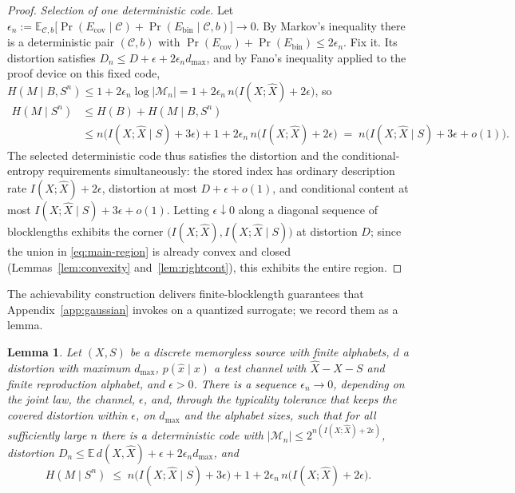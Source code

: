 \documentclass[11pt,onecolumn]{IEEEtran}
\newtheorem{lemma}[theorem]{Lemma}
\newcommand{\E}{\mathbb{E}}
\newcommand{\hX}{\widehat{X}}
\begin{document}
\begin{proof}
\emph{Selection of one deterministic code.} Let
$\epsilon_n:=\E_{\mathcal C,b}\bigl[\Pr(E_{\mathrm{cov}}\mid\mathcal C)
+\Pr(E_{\mathrm{bin}}\mid\mathcal C,b)\bigr]\to0$. By Markov's
inequality there is a deterministic pair $(\mathcal C,b)$ with
$\Pr(E_{\mathrm{cov}})+\Pr(E_{\mathrm{bin}})\le2\epsilon_n$. Fix it.
Its distortion satisfies
$D_n\le D+\epsilon+2\epsilon_n d_{\max}$, and by Fano's inequality
applied to the proof device on this fixed code,
$H(M\mid B,S^n)\le1+2\epsilon_n\log|\mathcal M_n|
=1+2\epsilon_n\,n\bigl(I(X;\hX)+2\epsilon\bigr)$, so
\begin{align}
 H(M\mid S^n)
 &\le H(B)+H(M\mid B,S^n)\nonumber\\
 &\le n\bigl(I(X;\hX\mid S)+3\epsilon\bigr)
 +1+2\epsilon_n\,n\bigl(I(X;\hX)+2\epsilon\bigr)
 \;=\;n\bigl(I(X;\hX\mid S)+3\epsilon+o(1)\bigr).
 \label{eq:entropy-ach}
\end{align}
The selected deterministic code thus satisfies the distortion and the
conditional-entropy requirements simultaneously: the stored index has
ordinary description rate $I(X;\hX)+2\epsilon$, distortion at most
$D+\epsilon+o(1)$, and conditional content at most
$I(X;\hX\mid S)+3\epsilon+o(1)$. Letting $\epsilon\downarrow0$ along a
diagonal sequence of blocklengths exhibits the corner
$\bigl(I(X;\hX),I(X;\hX\mid S)\bigr)$ at distortion $D$; since the
union in \eqref{eq:main-region} is already convex and closed
(Lemmas~\ref{lem:convexity} and~\ref{lem:rightcont}), this exhibits
the entire region.
\end{proof}

The achievability construction delivers finite-blocklength guarantees
that Appendix~\ref{app:gaussian} invokes on a quantized surrogate; we
record them as a lemma.

\begin{lemma}\label{lem:construction}
Let $(X,S)$ be a discrete memoryless source with finite alphabets, $d$ a
distortion with maximum $d_{\max}$, $p(\hat x\mid x)$ a test channel
with $\hX-X-S$ and finite reproduction alphabet, and $\epsilon>0$. There
is a sequence $\epsilon_n\to0$, depending on the joint law, the channel,
$\epsilon$, and, through the typicality tolerance that keeps the covered
distortion within $\epsilon$, on $d_{\max}$ and the alphabet sizes, such
that for all sufficiently large $n$ there is a deterministic code
with $|\mathcal M_n|\le2^{n(I(X;\hX)+2\epsilon)}$, distortion
$D_n\le\E\,d(X,\hX)+\epsilon+2\epsilon_nd_{\max}$, and
\[
H(M\mid S^n)\;\le\;n\bigl(I(X;\hX\mid S)+3\epsilon\bigr)
+1+2\epsilon_n\,n\bigl(I(X;\hX)+2\epsilon\bigr).
\]
\end{lemma}
\end{document}
